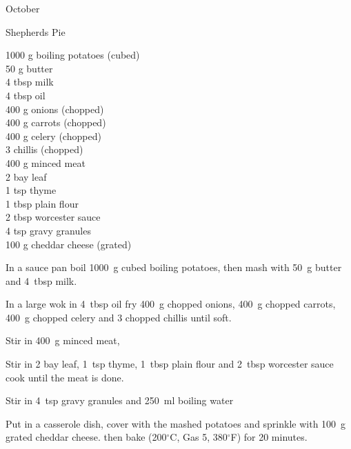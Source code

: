 \begin{menu}{October}
    \begin{recipe}{2}{Shepherds Pie}%
		\begin{ingredients}
		1000 g boiling potatoes (cubed) \\
	50 g butter  \\
	4 tbsp milk  \\
	4 tbsp oil  \\
	400 g onions (chopped) \\
	400 g carrots (chopped) \\
	400 g celery (chopped) \\
	3  chillis (chopped) \\
	400 g minced meat  \\
	2  bay leaf  \\
	1 tsp thyme  \\
	1 tbsp plain flour  \\
	2 tbsp worcester sauce  \\
	4 tsp gravy granules  \\
	100 g cheddar cheese (grated) \\
	
		\end{ingredients}
	
	
	
    \begin{instructions}
    \item 
        In a
        sauce pan
        boil
        1000~g cubed boiling potatoes,
        then mash with
        50~g  butter
        and
        4~tbsp  milk.
      \item 
        In a
        large wok
        in
        4~tbsp  oil
        fry
        400~g chopped onions,
        400~g chopped carrots,
        400~g chopped celery
        and
        3 chopped chillis
        until soft.
      \item 
        Stir in
        400~g  minced meat,
      \item 
        Stir in
        2  bay leaf,
        1~tsp  thyme,
        1~tbsp  plain flour
        and
        2~tbsp  worcester sauce
        cook until the meat is done.
      \item 
        Stir in
        4~tsp  gravy granules
        and
        250~ml  boiling water\item 
        Put in a
        casserole dish,
        cover with the mashed potatoes
        and sprinkle with
        100~g grated cheddar cheese.
        then bake
        (200$^{\circ}$C, Gas 5, 380$^{\circ}$F)
        for 20 minutes.
      

\end{instructions}
\end{recipe}
\end{menu}
